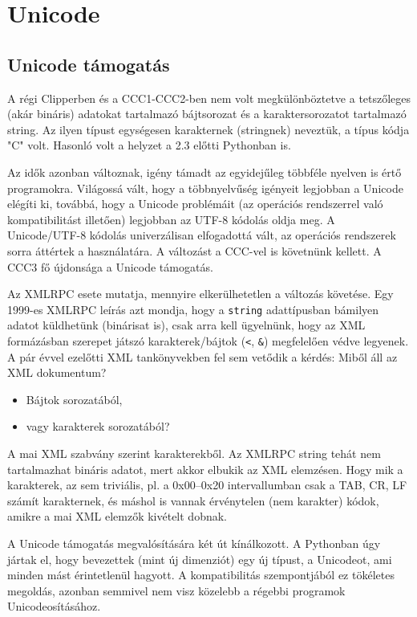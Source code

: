 
\section{Unicode}




\subsection{Unicode támogatás}

A régi Clipperben és a CCC1-CCC2-ben nem volt megkülönböztetve
a tetszőleges (akár bináris) adatokat tartalmazó bájtsorozat
és a karaktersorozatot tartalmazó string. Az ilyen típust egységesen 
karakternek (stringnek) neveztük, a típus kódja  "C" volt.
Hasonló volt a helyzet a 2.3 előtti Pythonban is.

Az idők azonban változnak, igény támadt az egyidejűleg
többféle nyelven is értő programokra. Világossá vált, hogy
a többnyelvűség igényeit legjobban a Unicode elégíti ki,
továbbá, hogy a Unicode problémáit (az operációs
rendszerrel való kompatibilitást illetően) legjobban
az UTF-8 kódolás oldja meg. A Unicode/UTF-8 kódolás univerzálisan 
elfogadottá vált, az operációs rendszerek sorra áttértek a használatára.
A változást a CCC-vel is követnünk kellett.
A CCC3 fő újdonsága a Unicode támogatás.

Az XMLRPC esete mutatja, mennyire elkerülhetetlen a változás követése. 
Egy 1999-es XMLRPC leírás azt mondja, hogy a \verb!string!
adattípusban bámilyen adatot küldhetünk (binárisat is),
csak arra kell ügyelnünk, hogy az XML formázásban szerepet
játszó karakterek/bájtok (\verb!<!, \verb!&!) megfelelően védve legyenek. 
A pár évvel ezelőtti XML tankönyvekben fel sem vetődik a kérdés:
Miből áll az XML dokumentum?
\begin{itemize}
\item Bájtok sorozatából,
\item vagy karakterek sorozatából?
\end{itemize}
A mai XML szabvány szerint karakterekből.
Az XMLRPC string tehát nem tartalmazhat bináris adatot, 
mert akkor elbukik az XML elemzésen. Hogy mik a karakterek,
az sem triviális, pl. a 0x00--0x20 intervallumban csak a
TAB, CR, LF számít karakternek, és máshol is vannak érvénytelen
(nem karakter) kódok, amikre a mai XML elemzők kivételt dobnak.

A Unicode támogatás megvalósítására két út kínálkozott.
A Pythonban úgy jártak el, hogy bevezettek (mint új dimenziót) 
egy új típust, a Unicodeot, ami minden mást érintetlenül hagyott.
A kompatibilitás szempontjából ez tökéletes megoldás,
azonban semmivel nem visz közelebb a régebbi programok
Unicodeosításához.

